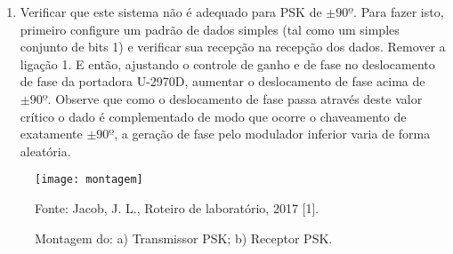 \begin{enumerate}
            \item Verificar que este sistema não é adequado para PSK de $\pm 90º$. Para fazer isto, primeiro configure um padrão de dados simples (tal como um simples conjunto de bits 1) e verificar sua recepção na recepção dos dados. Remover a ligação 1. E então, ajustando o controle de ganho e de fase no deslocamento de fase da portadora U-2970D, aumentar o deslocamento de fase acima de $\pm 90º$. Observe que como o deslocamento de fase passa através deste valor crítico o dado é complementado de modo que ocorre o chaveamento de exatamente $\pm 90º$, a geração de fase pelo modulador inferior varia de forma aleatória.
        \end{enumerate}
        
         \begin{figure}[H]
           	\centering
           	\caption{Montagem do: a) Transmissor PSK; b) Receptor PSK.}
           	\texttt{[image: montagem]}
           	
           	\small Fonte: Jacob, J. L., Roteiro de laboratório, 2017 [1].
           	\label{fig:montagem}
         \end{figure}